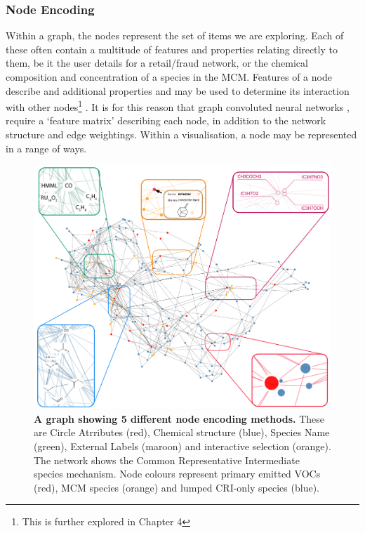  




\subsubsection{Node Encoding}
Within a graph, the nodes represent the set of items we are exploring. Each of these often contain a multitude of features and properties relating directly to them, be it the user details for a retail/fraud network, or the chemical composition and concentration of a species in the MCM. Features of a node describe and additional properties and may be used to determine its interaction with other nodes\footnote{This is further explored in Chapter 4} \citep{protocol}. It is for this reason that graph convoluted neural networks \citep{t2gcn}, require a  `feature matrix' describing each node, in addition to the network structure and edge weightings. Within a visualisation, a node may be represented in a range of ways. 



\begin{figure}[H]
     \centering
     \includegraphics[width=\textwidth]{figures_c1/NODES_001f3d-00775b-ff9000-f71735-c10053.pdf}
        \caption{\textbf{A graph showing 5 different node encoding methods.} These are Circle Atrributes (red), Chemical structure (blue), Species Name (green), External Labels (maroon) and interactive selection (orange). The network shows the Common Representative Intermediate species \citep{cri} mechanism. Node colours represent primary emitted VOCs (red), MCM species (orange) and lumped CRI-only species (blue).  }
      \label{fig:nodestyle}
\end{figure}





